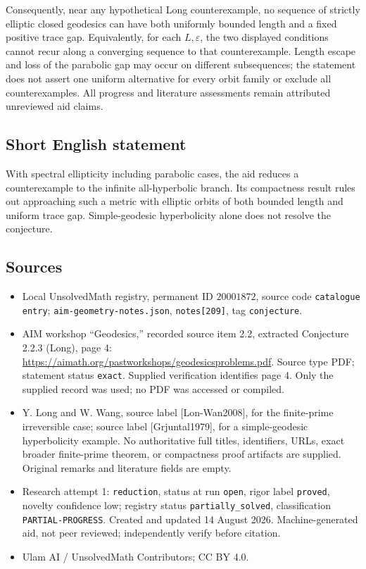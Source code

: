 \documentclass[11pt]{article}
\begin{document}
Consequently, near any hypothetical Long counterexample, no sequence of strictly elliptic closed geodesics can have both uniformly bounded length and a fixed positive trace gap. Equivalently, for each \(L,\varepsilon\), the two displayed conditions cannot recur along a converging sequence to that counterexample. Length escape and loss of the parabolic gap may occur on different subsequences; the statement does not assert one uniform alternative for every orbit family or exclude all counterexamples. All progress and literature assessments remain attributed unreviewed aid claims.
\subsection{Short English statement}
With spectral ellipticity including parabolic cases, the aid reduces a counterexample to the infinite all-hyperbolic branch. Its compactness result rules out approaching such a metric with elliptic orbits of both bounded length and uniform trace gap. Simple-geodesic hyperbolicity alone does not resolve the conjecture.
\subsection{Sources}
\begin{itemize}
\item Local UnsolvedMath registry, permanent ID \(20001872\), source code \texttt{catalogue entry}; \texttt{aim-geometry-notes.json}, \texttt{notes[209]}, tag \texttt{conjecture}.
\item AIM workshop ``Geodesics,'' recorded source item 2.2, extracted Conjecture 2.2.3 (Long), page 4: \url{https://aimath.org/pastworkshops/geodesicsproblems.pdf}. Source type PDF; statement status \texttt{exact}. Supplied verification identifies page 4. Only the supplied record was used; no PDF was accessed or compiled.
\item Y. Long and W. Wang, source label [Lon-Wan2008], for the finite-prime irreversible case; source label [Grjuntal1979], for a simple-geodesic hyperbolicity example. No authoritative full titles, identifiers, URLs, exact broader finite-prime theorem, or compactness proof artifacts are supplied. Original remarks and literature fields are empty.
\item Research attempt 1: \texttt{reduction}, status at run \texttt{open}, rigor label \texttt{proved}, novelty confidence low; registry status \texttt{partially\_solved}, classification \texttt{PARTIAL-PROGRESS}. Created and updated 14 August 2026. Machine-generated aid, not peer reviewed; independently verify before citation.
\item Ulam AI / UnsolvedMath Contributors; CC BY 4.0.
\end{itemize}
\end{document}
